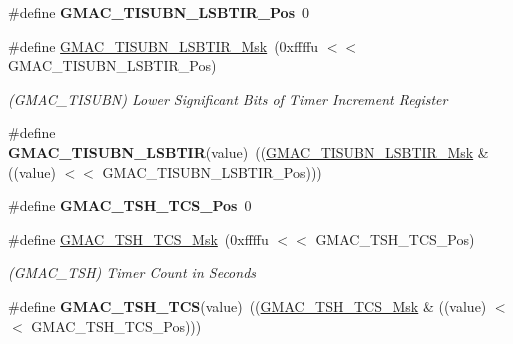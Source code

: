 \begin{DoxyCompactItemize}
\mbox{\label{group__SAME70__GMAC_gadbab2193d402a31a9a0c51f4bac168f3}} 
\#define {\bfseries G\+M\+A\+C\+\_\+\+T\+I\+S\+U\+B\+N\+\_\+\+L\+S\+B\+T\+I\+R\+\_\+\+Pos}~0
\item 
\mbox{\label{group__SAME70__GMAC_ga13bc69fe3e9340ed8278e723a1637ec0}} 
\#define \mbox{\hyperlink{group__SAME70__GMAC_ga13bc69fe3e9340ed8278e723a1637ec0}{G\+M\+A\+C\+\_\+\+T\+I\+S\+U\+B\+N\+\_\+\+L\+S\+B\+T\+I\+R\+\_\+\+Msk}}~(0xffffu $<$$<$ G\+M\+A\+C\+\_\+\+T\+I\+S\+U\+B\+N\+\_\+\+L\+S\+B\+T\+I\+R\+\_\+\+Pos)
\begin{DoxyCompactList}\small\item\em (G\+M\+A\+C\+\_\+\+T\+I\+S\+U\+BN) Lower Significant Bits of Timer Increment Register \end{DoxyCompactList}\item 
\mbox{\label{group__SAME70__GMAC_gab376f8af18796b59475a351442d95d7a}} 
\#define {\bfseries G\+M\+A\+C\+\_\+\+T\+I\+S\+U\+B\+N\+\_\+\+L\+S\+B\+T\+IR}(value)~((\mbox{\hyperlink{group__SAMV71__GMAC_ga13bc69fe3e9340ed8278e723a1637ec0}{G\+M\+A\+C\+\_\+\+T\+I\+S\+U\+B\+N\+\_\+\+L\+S\+B\+T\+I\+R\+\_\+\+Msk}} \& ((value) $<$$<$ G\+M\+A\+C\+\_\+\+T\+I\+S\+U\+B\+N\+\_\+\+L\+S\+B\+T\+I\+R\+\_\+\+Pos)))
\item 
\mbox{\label{group__SAME70__GMAC_ga429a2cebc175ba5436e5bd275a2a2d51}} 
\#define {\bfseries G\+M\+A\+C\+\_\+\+T\+S\+H\+\_\+\+T\+C\+S\+\_\+\+Pos}~0
\item 
\mbox{\label{group__SAME70__GMAC_gac677df57fd14d3dd92d0b91daada842b}} 
\#define \mbox{\hyperlink{group__SAME70__GMAC_gac677df57fd14d3dd92d0b91daada842b}{G\+M\+A\+C\+\_\+\+T\+S\+H\+\_\+\+T\+C\+S\+\_\+\+Msk}}~(0xffffu $<$$<$ G\+M\+A\+C\+\_\+\+T\+S\+H\+\_\+\+T\+C\+S\+\_\+\+Pos)
\begin{DoxyCompactList}\small\item\em (G\+M\+A\+C\+\_\+\+T\+SH) Timer Count in Seconds \end{DoxyCompactList}\item 
\mbox{\label{group__SAME70__GMAC_ga095655beb75100e85446c07e5098e30d}} 
\#define {\bfseries G\+M\+A\+C\+\_\+\+T\+S\+H\+\_\+\+T\+CS}(value)~((\mbox{\hyperlink{group__SAMV71__GMAC_gac677df57fd14d3dd92d0b91daada842b}{G\+M\+A\+C\+\_\+\+T\+S\+H\+\_\+\+T\+C\+S\+\_\+\+Msk}} \& ((value) $<$$<$ G\+M\+A\+C\+\_\+\+T\+S\+H\+\_\+\+T\+C\+S\+\_\+\+Pos)))

\end{DoxyCompactItemize}
